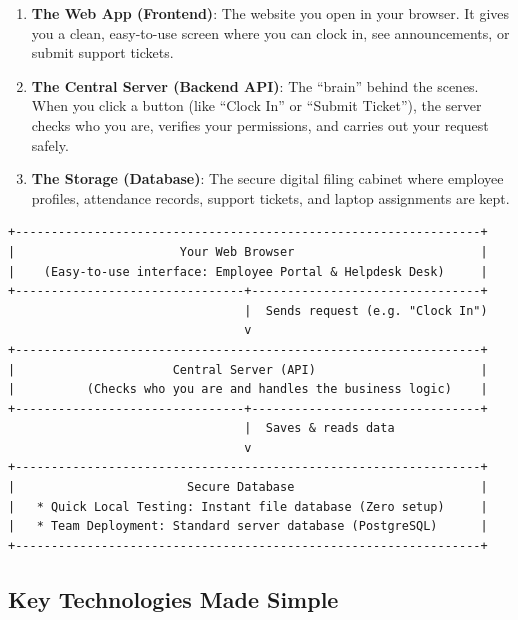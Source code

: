 \documentclass[a4paper,11pt]{article}
\begin{document}
\begin{enumerate}
    \item \textbf{The Web App (Frontend)}: The website you open in your browser. It gives you a clean, easy-to-use screen where you can clock in, see announcements, or submit support tickets.
    \item \textbf{The Central Server (Backend API)}: The ``brain'' behind the scenes. When you click a button (like ``Clock In'' or ``Submit Ticket''), the server checks who you are, verifies your permissions, and carries out your request safely.
    \item \textbf{The Storage (Database)}: The secure digital filing cabinet where employee profiles, attendance records, support tickets, and laptop assignments are kept.
\end{enumerate}

\begin{center}
\begin{tcolorbox}[colback=white,colframe=branddark,arc=2mm,boxrule=0.8pt,width=0.98\textwidth]
\centering
\small
\begin{verbatim}
+-----------------------------------------------------------------+
|                       Your Web Browser                          |
|    (Easy-to-use interface: Employee Portal & Helpdesk Desk)     |
+--------------------------------+--------------------------------+
                                 |  Sends request (e.g. "Clock In")
                                 v
+-----------------------------------------------------------------+
|                      Central Server (API)                       |
|          (Checks who you are and handles the business logic)    |
+--------------------------------+--------------------------------+
                                 |  Saves & reads data
                                 v
+-----------------------------------------------------------------+
|                        Secure Database                          |
|   * Quick Local Testing: Instant file database (Zero setup)     |
|   * Team Deployment: Standard server database (PostgreSQL)      |
+-----------------------------------------------------------------+
\end{verbatim}
\end{tcolorbox}
\end{center}

\subsection{Key Technologies Made Simple}
\end{document}
